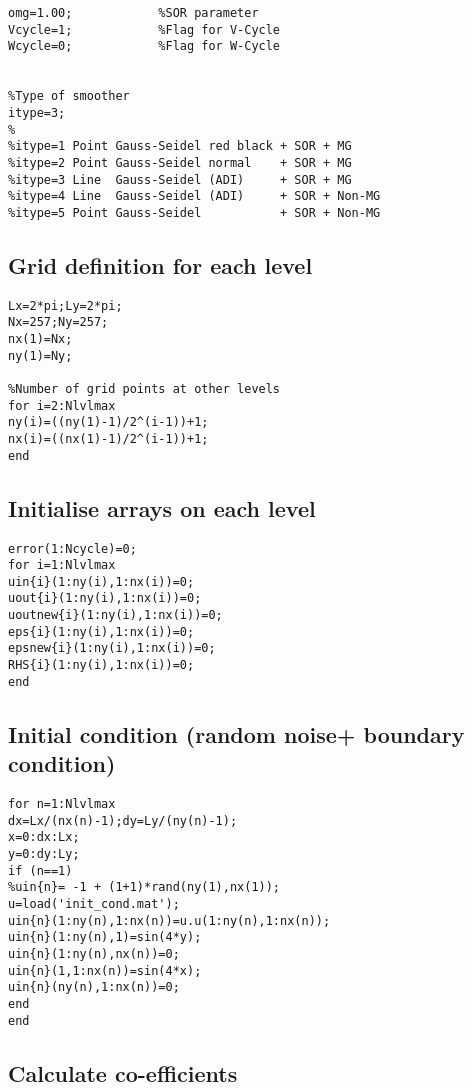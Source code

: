 \documentclass[11pt]{report}
\begin{document}
\begin{appendices}
\begin{verbatim}
omg=1.00;            %SOR parameter
Vcycle=1;            %Flag for V-Cycle
Wcycle=0;            %Flag for W-Cycle


%Type of smoother
itype=3;
%
%itype=1 Point Gauss-Seidel red black + SOR + MG
%itype=2 Point Gauss-Seidel normal    + SOR + MG
%itype=3 Line  Gauss-Seidel (ADI)     + SOR + MG
%itype=4 Line  Gauss-Seidel (ADI)     + SOR + Non-MG
%itype=5 Point Gauss-Seidel           + SOR + Non-MG
\end{verbatim}


\subsection*{Grid definition for each level}

\begin{verbatim}
Lx=2*pi;Ly=2*pi;
Nx=257;Ny=257;
nx(1)=Nx;
ny(1)=Ny;

%Number of grid points at other levels
for i=2:Nlvlmax
ny(i)=((ny(1)-1)/2^(i-1))+1;
nx(i)=((nx(1)-1)/2^(i-1))+1;
end
\end{verbatim}


\subsection*{Initialise arrays on each level}

\begin{verbatim}
error(1:Ncycle)=0;
for i=1:Nlvlmax
uin{i}(1:ny(i),1:nx(i))=0;
uout{i}(1:ny(i),1:nx(i))=0;
uoutnew{i}(1:ny(i),1:nx(i))=0;
eps{i}(1:ny(i),1:nx(i))=0;
epsnew{i}(1:ny(i),1:nx(i))=0;
RHS{i}(1:ny(i),1:nx(i))=0;
end
\end{verbatim}


\subsection*{Initial condition (random noise+ boundary condition)}

\begin{verbatim}
for n=1:Nlvlmax
dx=Lx/(nx(n)-1);dy=Ly/(ny(n)-1);
x=0:dx:Lx;
y=0:dy:Ly;
if (n==1)
%uin{n}= -1 + (1+1)*rand(ny(1),nx(1));
u=load('init_cond.mat');
uin{n}(1:ny(n),1:nx(n))=u.u(1:ny(n),1:nx(n));
uin{n}(1:ny(n),1)=sin(4*y);
uin{n}(1:ny(n),nx(n))=0;
uin{n}(1,1:nx(n))=sin(4*x);
uin{n}(ny(n),1:nx(n))=0;
end
end
\end{verbatim}


\subsection*{Calculate co-efficients}


\end{appendices}
\end{document}
